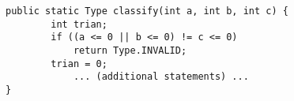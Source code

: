\begin{lstlisting}
public static Type classify(int a, int b, int c) {
		int trian;
		if ((a <= 0 || b <= 0) != c <= 0)
			return Type.INVALID;
		trian = 0;
	        ... (additional statements) ...
}
\end{lstlisting}
